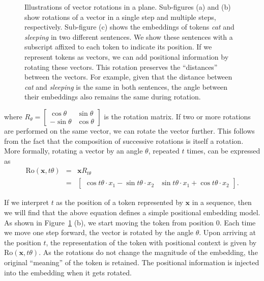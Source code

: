 \begin{figure}[!t]
\centering

\caption{Illustrations of vector rotations in a plane. Sub-figures (a) and (b) show rotations of a vector in a single step and multiple steps, respectively. Sub-figure (c) shows the embeddings of tokens \textit{cat} and \textit{sleeping} in two different sentences. We show these sentences with a subscript affixed to each token to indicate its position. If we represent tokens as vectors, we can add positional information by rotating these vectors. This rotation preserves the ``distances'' between the vectors. For example, given that the distance between \textit{cat} and \textit{sleeping} is the same in both sentences, the angle between their embeddings also remains the same during rotation.}
\label{fig:vector-rotation}
\end{figure}

\noindent where $R_{\theta} = \begin{bmatrix} \cos \theta & \sin \theta \\ -\sin \theta & \cos \theta \end{bmatrix}$ is the rotation matrix. If two or more rotations are performed on the same vector, we can rotate the vector further. This follows from the fact that the composition of successive rotations is itself a rotation. More formally, rotating a vector by an angle $\theta$, repeated $t$ times, can be expressed as
\begin{eqnarray}
\mathrm{Ro}(\mathbf{x},t\theta) & = & \mathbf{x} R_{t \theta} \nonumber \\
                                & = & \begin{bmatrix} \cos t \theta \cdot x_1 - \sin t \theta \cdot x_2 & \sin t \theta \cdot x_1 + \cos t \theta \cdot x_2 \end{bmatrix}.
\end{eqnarray}

If we interpret $t$ as the position of a token represented by $\mathbf{x}$ in a sequence, then we will find that the above equation defines a simple positional embedding model. As shown in Figure~\ref{fig:vector-rotation} (b), we start moving the token from position 0. Each time we move one step forward, the vector is rotated by the angle $\theta$. Upon arriving at the position $t$, the representation of the token with positional context is given by $\mathrm{Ro}(\mathbf{x},t\theta)$. As the rotations do not change the magnitude of the embedding, the original ``meaning'' of the token is retained. The positional information is injected into the embedding when it gets rotated.

